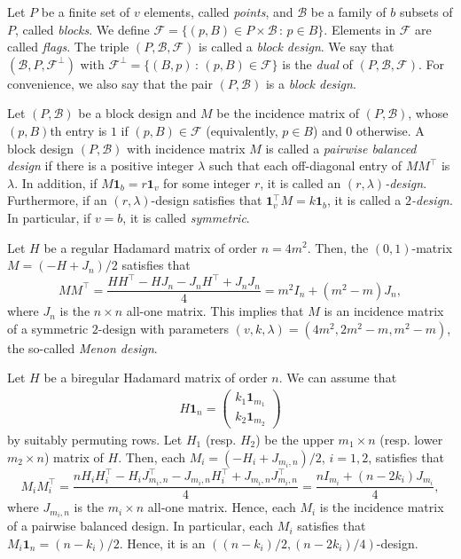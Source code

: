 \documentclass[ALCO,ThmDefs,Unicode]{cedram}
\newcommand*\tra{\top}
\newcommand*{\un}{\mathbf{1}}
\begin{document}
Let $P$ be a finite set of $v$ elements, called \emph{points}, and ${\mathcal B}$ be a family of $b$ subsets of $P$, called \emph{blocks}. We define ${\mathcal F}=\{(p,B)\in P\times {\mathcal B}\,:\,p\in B\}$. Elements in ${\mathcal F}$ are called \emph{flags}. The triple $(P,{\mathcal B},{\mathcal F})$ is called a \emph{block design}. We say that $({\mathcal B},P,{\mathcal F}^\perp)$ with ${\mathcal F}^\perp=\{(B,p)\,:\,(p,B)\in {\mathcal F}\}$ is the \emph{dual} of $(P,{\mathcal B},{\mathcal F})$. For convenience, we also say that the pair $(P,{\mathcal B})$ is a \emph{block design}.

Let $(P,{\mathcal B})$ be a block design and $M$ be the incidence matrix of $(P,{\mathcal B})$, whose $(p,B)$th entry is $1$ if $(p,B)\in {\mathcal F}$ (equivalently, $p\in B$) and $0$ otherwise. A block design $(P,{\mathcal B})$ with incidence matrix $M$ is called a \emph{pairwise balanced design} if there is a positive integer $\lambda$ such that each off-diagonal entry of $MM^\tra$ is $\lambda$. In addition, if $M \un_b=r \un_v$ for some integer $r$, it is called an \emph{$(r,\lambda)$-design}. Furthermore, if an $(r,\lambda)$-design satisfies that $\un_v^\tra M=k \un_b$, it is called a \emph{$2$-design}. In particular, if $v=b$, it is called \emph{symmetric}.

Let $H$ be a regular Hadamard matrix of order $n=4m^2$. Then, the $(0,1)$-matrix $M=(-H+J_n)/2$ satisfies that
\[
MM^\tra=\frac{HH^\tra-HJ_{n}-J_{n}H^\tra+J_{n}J_{n}}{4}=m^2I_{n}+(m^2-m)J_{n},
\]
where $J_n$ is the $n\times n$ all-one matrix. This implies that $M$ is an incidence matrix of a symmetric $2$-design with parameters $(v,k,\lambda)=(4m^2,2m^2-m,m^2-m)$, the so-called \emph{Menon design}.

Let $H$ be a biregular Hadamard matrix of order $n$. We can assume that
\begin{align*}
H\un_n=
\begin{pmatrix} k_1 \un_{m_1}\\ k_2 \un_{m_2}
\end{pmatrix}
\end{align*}
by suitably permuting rows. Let $H_1$ (resp. $H_2$) be the upper $m_1\times n$ (resp. lower $m_2\times n$) matrix of $H$. Then, each $M_i=(-H_i+J_{m_i,n})/2$, $i=1,2$, satisfies that
\[
M_iM_i^\tra=\frac{nH_iH_i^\tra-H_iJ_{m_i,n}^\tra-J_{m_i,n}H_i^\tra+J_{m_i,n}J_{m_i,n}^\tra}{4}=\frac{nI_{m_i}+(n-2k_i)J_{m_i}}{4},
\]
where $J_{m_i,n}$ is the $m_i\times n$ all-one matrix. Hence, each $M_i$ is the incidence matrix of a pairwise balanced design. In particular, each $M_i$ satisfies that $M_i\un_n=(n-k_i)/2$. Hence, it is an $((n-k_i)/2,(n-2k_i)/4)$-design.
\end{document}
